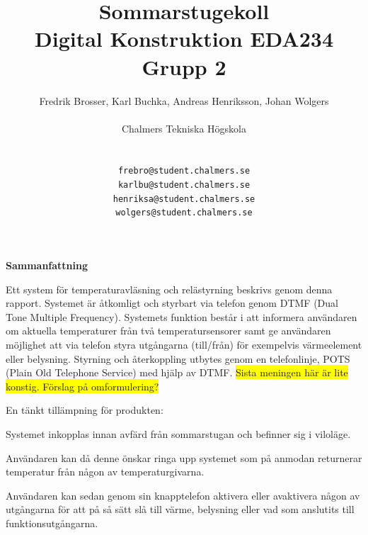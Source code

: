 \documentclass[a4paper,11pt]{article}
\begin{document}
\title{{\huge Sommarstugekoll} \\
	Digital Konstruktion EDA234 \\ Grupp 2}
\author{Fredrik Brosser, Karl Buchka, Andreas Henriksson, Johan Wolgers \\ \\
   	Chalmers Tekniska Högskola \\ \\
	\begin{tabular}{l c r}
		\texttt{frebro} & \texttt{@} & \texttt{student.chalmers.se}\\
		\texttt{karlbu} & \texttt{@} & \texttt{student.chalmers.se}\\
		\texttt{henriksa} & \texttt{@} & \texttt{student.chalmers.se}\\
		\texttt{wolgers} & \texttt{@} & \texttt{student.chalmers.se}\\\\
	\end{tabular}
	}

\maketitle
 \thispagestyle{empty}
\pagebreak
 \thispagestyle{empty}
	\tableofcontents
 \thispagestyle{empty}

\pagebreak


\begin{center}
	{\noindent \bf Sammanfattning}
\end{center}

	Ett system för temperaturavläsning och relästyrning beskrivs genom denna rapport. Systemet är åtkomligt och styrbart via telefon genom DTMF (Dual Tone Multiple Frequency). Systemets funktion består i att informera användaren om aktuella temperaturer från två temperatursensorer samt ge användaren möjlighet att via telefon styra utgångarna (till/från) för exempelvis värmeelement eller belysning. Styrning och återkoppling utbytes genom en telefonlinje, POTS (Plain Old Telephone Service) med hjälp av DTMF. \colorbox{yellow}{Sista meningen här är lite konstig. Förslag på omformulering?}

En tänkt tillämpning för produkten:
\begin{list}{*}{}
\item Systemet inkopplas innan avfärd från sommarstugan och befinner sig i viloläge. 
\item Användaren kan då denne önskar ringa upp systemet som på anmodan returnerar temperatur från någon av temperaturgivarna.
\item Användaren kan sedan genom sin knapptelefon aktivera eller avaktivera någon av utgångarna för att på så sätt slå till värme, belysning eller vad som anslutits till funktionsutgångarna.
\end{list}
\end{document}
